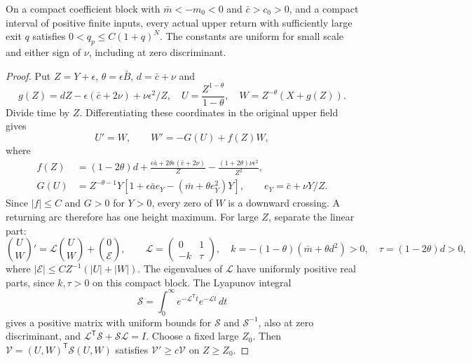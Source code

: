 \begin{lemma}
\label{rw:infinity:polynomial-upper}
On a compact coefficient block with $\bar m<-m_0<0$ and
$\bar c>c_0>0$, and a compact interval of positive finite inputs,
every actual upper return with sufficiently large exit $q$ satisfies
$0<q_p\le C(1+q)^N$. The constants are uniform for small scale
and either sign of $\nu$, including at zero discriminant.
\end{lemma}
\begin{proof}
Put $Z=Y+\epsilon$, $\theta=\epsilon\bar B$,
$d=\bar c+\nu$ and
\[
 g(Z)=dZ-\epsilon(\bar c+2\nu)+\nu\epsilon^2/Z,
 \quad U=\frac{Z^{1-\theta}}{1-\theta},\quad
 W=Z^{-\theta}(X+g(Z)).
\]
Divide time by $Z$. Differentiating these coordinates in the original
upper field gives
\[
 U'=W,\qquad W'=-G(U)+f(Z)W,
\]
where
\begin{align*}
 f(Z)&=(1-2\theta)d+
 \frac{\epsilon\bar a+2\theta\epsilon(\bar c+2\nu)}Z
       -\frac{(1+2\theta)\nu\epsilon^2}{Z^2},\\
 G(U)&=Z^{-\theta-1}Y
       [1+\epsilon\bar a e_Y-(\bar m+\theta e_Y^2)Y],
 \qquad e_Y=\bar c+\nu Y/Z.
\end{align*}
Since $|f|\le C$ and $G>0$ for $Y>0$, every zero of $W$ is a
downward crossing. A returning arc therefore has one height maximum.
For large $Z$, separate the linear part:
\[
 \binom{U}{W}'=\mathcal L\binom{U}{W}+\binom0{\mathcal E},\qquad
 \mathcal L=\begin{pmatrix}0&1\\-k&\tau\end{pmatrix},\quad
 k=-(1-\theta)(\bar m+\theta d^2)>0,\quad
 \tau=(1-2\theta)d>0,
\]
where $|\mathcal E|\le CZ^{-1}(|U|+|W|)$.
The eigenvalues of $\mathcal L$ have uniformly positive real parts,
since $k,\tau>0$ on this compact block. The Lyapunov integral
\[
 \mathcal S=\int_0^\infty e^{-\mathcal L^{\mathsf T}t}
                                  e^{-\mathcal Lt}\,dt
\]
gives a positive matrix with uniform bounds for $\mathcal S$ and
$\mathcal S^{-1}$, also at zero discriminant, and
$\mathcal L^{\mathsf T}\mathcal S+\mathcal S\mathcal L=I$.
Choose a fixed large
$Z_0$. Then
$\mathcal V=(U,W)^{\mathsf T}\mathcal S(U,W)$ satisfies
$\mathcal V'\ge c\mathcal V$ on $Z\ge Z_0$.


\end{proof}
